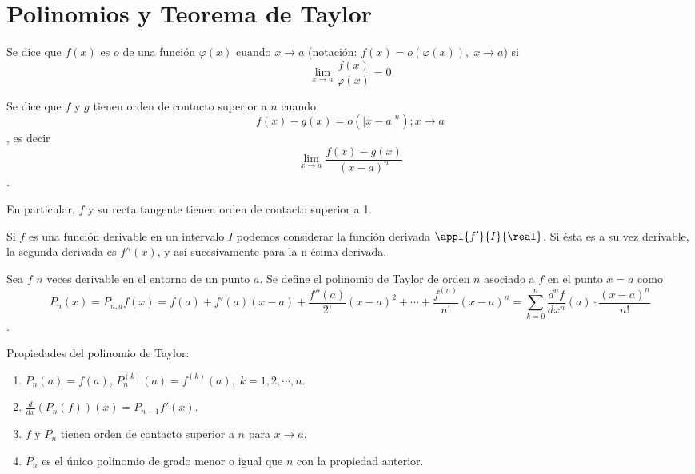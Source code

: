 \documentclass[nochap]{apuntes}
\begin{document}
\section{Polinomios y Teorema de Taylor}
\begin{defn}Se dice que $f(x)$ es $o$ de una función $\varphi(x)$ cuando $x\to a$ (notación: $f(x)=o(\varphi(x)),\; x\to a$) si \[ \lim_{x\to a} \frac{f(x)}{\varphi(x)}=0\]
\end{defn}

\begin{defn}Se dice que $f$ y $g$ tienen orden de contacto superior a $n$ cuando \[f(x)-g(x)=o(|x-a|^n); x\to a\], es decir \[ \lim_{x\to a}\frac{f(x)-g(x)}{(x-a)^n}\].
\end{defn}

En particular, $f$ y su recta tangente tienen orden de contacto superior a 1.

\begin{defn}
Si $f$ es una función derivable en un intervalo $I$ podemos considerar la función derivada $\appl{f'}{I}{\real}$. Si ésta es a su vez derivable, la segunda derivada es $f''(x)$, y así sucesivamente para la n-ésima derivada. \end{defn}

\begin{defn} Sea $f$ $n$ veces derivable en el entorno de un punto $a$. Se define el polinomio de Taylor de orden $n$ asociado a $f$ en el punto $x=a$ como \[ P_n(x)=P_{n,a}f(x)=f(a)+f'(a)(x-a)+\frac{f''(a)}{2!}(x-a)^2+\cdots + \frac{f^{(n)}}{n!}(x-a)^n = \sum_{k=0}^n \frac{d^nf}{dx^{n}} (a)\cdot \frac{(x-a)^n}{n!} \].
\end{defn}

Propiedades del polinomio de Taylor:

\begin{enumerate}
\item $P_n(a)=f(a)$, $P_n^{(k)}(a)=f^{(k)}(a),\; k=1,2,\cdots,n$.
\item $\frac{d}{dx}\left(P_n(f)\right)(x)=P_{n-1}f'(x)$.
\item $f$ y $P_n$ tienen orden de contacto superior a $n$ para $x\to a$.
\item $P_n$ es el único polinomio de grado menor o igual que $n$ con la propiedad anterior.
\end{enumerate}
\end{document}
